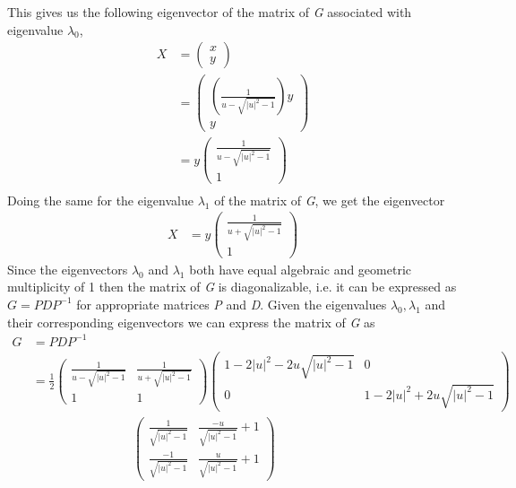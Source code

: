 This gives us the following eigenvector of the matrix of \textit{G} associated with eigenvalue $\lambda_0$,
\begin{align}
X &= 
\begin{pmatrix}
x\\
y
\end{pmatrix}\\
&= 
\begin{pmatrix}
\left(\frac{1}{u - \sqrt{\left\vert u \right\vert^{2} - 1}}\right)y\\
y
\end{pmatrix}\\
&= y
\begin{pmatrix}
\frac{1}{u - \sqrt{\left\vert u \right\vert^{2} - 1}}\\
1
\end{pmatrix}\\
\end{align}
Doing the same for the eigenvalue $\lambda_1$ of the matrix of \textit{G}, we get the eigenvector
\begin{align}
X &= y
\begin{pmatrix}
\frac{1}{u + \sqrt{\left\vert u \right\vert^{2} - 1}}\\
1
\end{pmatrix}
\end{align}
Since the eigenvectors $\lambda_0$ and $\lambda_1$ both have equal algebraic and geometric multiplicity of 1 then the matrix of \textit{G} is diagonalizable, i.e. it can be expressed as $G=PDP^{-1}$ for appropriate matrices \textit{P} and \textit{D}. Given the eigenvalues $\lambda_0, \lambda_1$ and their corresponding eigenvectors we can express the matrix of \textit{G} as
\begin{align}
G &= PDP^{-1}\\
&=
\frac{1}{2}
\begin{pmatrix}
\frac{1}{u - \sqrt{\left\vert u \right\vert^{2} - 1}} & \frac{1}{u + \sqrt{\left\vert u \right\vert^{2} - 1}}\\
1 & 1
\end{pmatrix}
\begin{pmatrix}
1 - 2\vert u \vert^2 - 2u\sqrt{\vert u \vert^2 - 1} & 0 \\
0 & 1 - 2\vert u \vert^2 + 2u\sqrt{\vert u \vert^2 - 1}
\end{pmatrix}\\
& \quad\quad\quad\quad\quad\quad\quad\quad
\begin{pmatrix}
\frac{1}{\sqrt{\vert u \vert^2 - 1}} & \frac{-u}{\sqrt{\vert u \vert^2 - 1}} + 1\\
\frac{-1}{\sqrt{\vert u \vert^2 - 1}} & \frac{u}{\sqrt{\vert u \vert^2 - 1}} + 1 
\end{pmatrix}\nonumber
\end{align}
